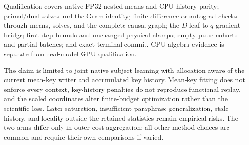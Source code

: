 \documentclass[10pt]{article}
\begin{document}
Qualification covers native FP32 nested means and CPU history parity;
primal/dual solves and the Gram identity; finite-difference or autograd
checks through means, solves, and the complete causal graph; the $D$-leaf
to $q$ gradient bridge; first-step bounds and unchanged physical clamps;
empty pulse cohorts and partial batches; and exact terminal commit.
CPU algebra evidence is separate from real-model GPU qualification.

The claim is limited to joint native subject learning with allocation
aware of the current mean-key writer and accumulated key history.
Mean-key fitting does not enforce every context, key-history penalties
do not reproduce functional replay, and the scaled coordinates alter
finite-budget optimization rather than the scientific loss. Later
saturation, insufficient paraphrase generalization, stale history, and
locality outside the retained statistics remain empirical risks. The
two arms differ only in outer cost aggregation; all other method choices
are common and require their own comparisons if varied.
\end{document}
